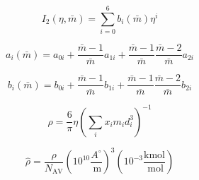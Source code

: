 \documentclass[12pt, letterpaper]{article}
\begin{document}
\begin{equation}
    I_{2}(\eta, \bar{m})=\sum_{i=0}^6 b_{i}(\bar{m}) \eta^i
    \label{eq:i2_disp}
\end{equation}


\begin{equation}
    a_{i}(\bar{m})=a_{0 i}+\frac{\bar{m}-1}{\bar{m}} a_{1 i}+\frac{\bar{m}-1}{\bar{m}} \frac{\bar{m}-2}{\bar{m}} a_{2 i}
    \label{eq:a_i_mbar}
\end{equation}


\begin{equation}
    b_{i}(\bar{m})=b_{0 i}+\frac{\bar{m}-1}{\bar{m}} b_{1 i}+\frac{\bar{m}-1}{\bar{m}} \frac{\bar{m}-2}{\bar{m}} b_{2 i}
    \label{eq:b_i_mbar}
\end{equation}


\begin{equation}
    \rho=\frac{6}{\pi} \eta\left(\sum_{i} x_{i} m_{i} d_{i}^3\right)^{-1}
    \label{eq:rho_from_eta}
\end{equation}


\begin{equation}
    \hat{\rho}=\frac{\rho}{N_{\mathrm{AV}}}\left(10^{10} \frac{A^\circ{}}{\mathrm{~m}}\right)^3\left(10^{-3} \frac{\mathrm{kmol}}{\mathrm{~mol}}\right)
    \label{eq:rho_reduced}
\end{equation}
\end{document}
